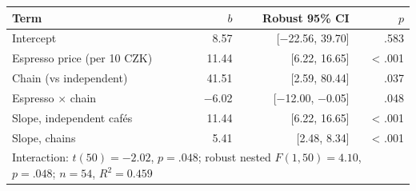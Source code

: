 \begin{tabular}{lrrr}
\toprule
Term & $b$ & Robust 95\% CI & $p$ \\
\midrule
Intercept & 8.57 & [\ensuremath{-}22.56, 39.70] & .583 \\
Espresso price (per 10 CZK) & 11.44 & [6.22, 16.65] & < .001 \\
Chain (vs independent) & 41.51 & [2.59, 80.44] & .037 \\
Espresso $\times$ chain & \ensuremath{-}6.02 & [\ensuremath{-}12.00, \ensuremath{-}0.05] & .048 \\
\midrule
Slope, independent caf\'es & 11.44 & [6.22, 16.65] & < .001 \\
Slope, chains & 5.41 & [2.48, 8.34] & < .001 \\
\midrule
\multicolumn{4}{l}{Interaction: $t(50) = \ensuremath{-}2.02$, $p = .048$; robust nested $F(1, 50) = 4.10$, $p = .048$; $n = 54$, $R^2 = 0.459$} \\
\bottomrule
\end{tabular}
